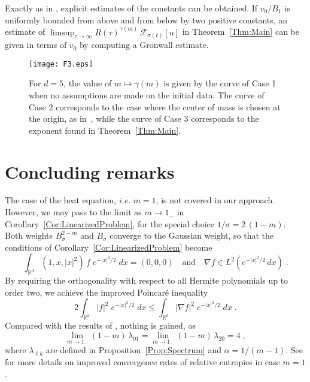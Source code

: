 \begin{remark}\label{Rem4}
Exactly as in \cite[Corollary 3]{BDGV}, explicit estimates of the constants can be obtained. If $v_0/B_1$ is uniformly bounded from above and from
below by two positive constants, an estimate of $\limsup_{\tau\to\infty}R(\tau)^{\gamma(m)}\,\mathcal F_{\sigma(t)}[u]$ in Theorem~\ref{Thm:Main}
can be given in terms of $v_0$ by computing a Gronwall estimate.
\end{remark}

\begin{figure}[hb]\begin{center}\texttt{[image: F3.eps]}
\caption{For $d=5$, the value of $m\mapsto\gamma(m)$ is given by the curve of Case 1 when no
 assumptions are made on the initial data. The curve of Case 2 corresponds to the case
  where the center of mass is chosen at the origin, as in~\cite{BDGV}, while the curve of Case 3
  corresponds to the exponent found in Theorem~\ref{Thm:Main}.}\end{center}\end{figure}

\section{Concluding remarks}\label{Sec:Conclusion}

The case of the heat equation, \emph{i.e.} $m=1$, is not covered in our approach. However, we may pass to the limit as $m\to 1_-$ in
Corollary~\ref{Cor:LinearizedProblem}, for the special choice $1/\sigma=2\,(1-m)$. Both weights $B_\sigma^{2-m}$ and $B_\sigma$ converge to the Gaussian weight, so that the conditions of Corollary~\ref{Cor:LinearizedProblem} become
\[
{\int_{{{\mathbb R}}^d}{{(1,x,|x|^2)\,f\;e^{-|x|^2/2}}}\;dx}=(0,0,0)\quad\mbox{and}\quad\nabla f\in L^2(e^{-|x|^2/2}\,dx)\;.
\]
By requiring the orthogonality with respect to all Hermite polynomials up to order two, we achieve the improved Poincar\'e inequality
\[
2\int_{{{\mathbb R}}^d}|f|^2\;e^{-|x|^2/2}\;dx\le \int_{{{\mathbb R}}^d}|\nabla f|^2\;e^{-|x|^2/2}\;dx\;.
\]
Compared with the results of \cite{BDGV}, nothing is gained, as
\[
\lim_{m\to 1_-}(1-m)\,\lambda_{01}=\lim_{m\to 1_-}(1-m)\,\lambda_{20}=4\;,
\]
where $\lambda_{\ell k}$ are defined in Proposition~\ref{Prop:Spectrum} and $\alpha=1/(m-1)$. See \cite{BBDE} for more details on improved
convergence rates of relative entropies in case $m=1$.

